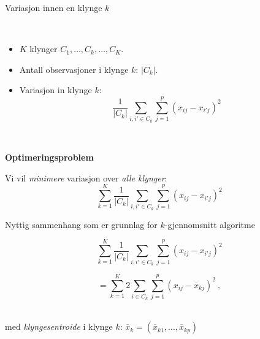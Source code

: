 \documentclass[10pt,ignorenonframetext,]{beamer}
\begin{document}
\begin{frame}

\begin{block}{Variasjon innen en klynge \(k\)}

\(~\)

\begin{itemize}
\item
  \(K\) klynger \(C_1, \ldots, C_k, \ldots, C_K\).
\item
  Antall observasjoner i klynge \(k\): \(|C_k|\).
\item
  Variasjon in klynge \(k\):
  \[\frac{1}{|C_k|} \sum_{i,i'\in C_k}\sum_{j=1}^p (x_{ij}-x_{i'j})^2\]
\end{itemize}

\(~\)

\textbf{Optimeringsproblem}

Vi vil \emph{minimere} variasjon over \emph{alle klynger}:
\[\sum_{k=1}^K\frac{1}{|C_k|} \sum_{i,i'\in C_k}\sum_{j=1}^p (x_{ij}-x_{i'j})^2\]

\end{block}

\end{frame}

\begin{frame}

Nyttig sammenhang som er grunnlag for \(k\)-gjennomsnitt algoritme

\[\sum_{k=1}^K\frac{1}{|C_k|} \sum_{i,i'\in C_k}\sum_{j=1}^p (x_{ij}-x_{i'j})^2\]

\[ = \sum_{k=1}^K 2 \sum_{i\in C_k}\sum_{j=1}^p (x_{ij}-\overline{x}_{kj})^2\ ,\]
\(~\)

med \emph{klyngesentroide} i klynge \(k\):
\(\overline{x}_k = (\overline{x}_{k1}, \ldots, \overline{x}_{kp})\)

\end{frame}
\end{document}
